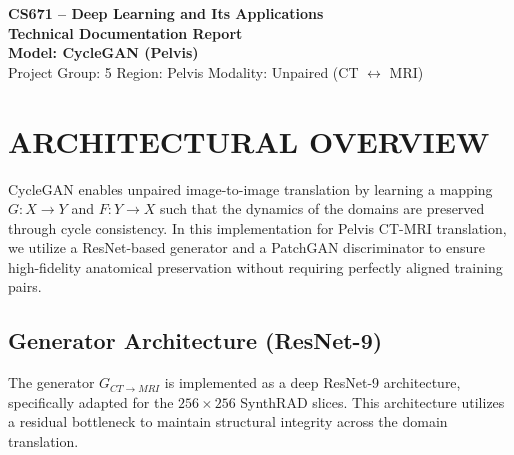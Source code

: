 \documentclass[10pt,a4paper]{article}
\begin{document}
\begin{tcolorbox}[
  enhanced,
  colback=softbg,
  colframe=brand,
  boxrule=0.9pt,
  arc=2mm,
  left=5pt,right=5pt,top=5pt,bottom=5pt
]
\centering
{\Large\bfseries\color{brand} CS671 -- Deep Learning and Its Applications}\\[2pt]
{\large\bfseries Technical Documentation Report}\\[6pt]
{\normalsize\bfseries Model: CycleGAN (Pelvis)}\\[4pt]
\small
Project Group: 5 \quad Region: Pelvis \quad Modality: Unpaired (CT $\leftrightarrow$ MRI)
\end{tcolorbox}

\section{ARCHITECTURAL OVERVIEW}
CycleGAN enables unpaired image-to-image translation by learning a mapping $G: X \to Y$ and $F: Y \to X$ such that the dynamics of the domains are preserved through cycle consistency. In this implementation for Pelvis CT-MRI translation, we utilize a ResNet-based generator and a PatchGAN discriminator to ensure high-fidelity anatomical preservation without requiring perfectly aligned training pairs.

\subsection{Generator Architecture (ResNet-9)}
The generator $G_{CT \to MRI}$ is implemented as a deep ResNet-9 architecture, specifically adapted for the $256 \times 256$ SynthRAD slices. This architecture utilizes a residual bottleneck to maintain structural integrity across the domain translation.
\end{document}
